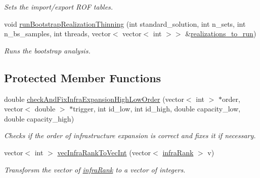 \begin{DoxyCompactItemize}
\begin{DoxyCompactList}\small\item\em Sets the import/export R\+OF tables. \end{DoxyCompactList}\item 
void \mbox{\hyperlink{classProblem_aa5a4c047b3bdc97762cb4e5a91ebd5de_aa5a4c047b3bdc97762cb4e5a91ebd5de}{run\+Bootstrap\+Realization\+Thinning}} (int standard\+\_\+solution, int n\+\_\+sets, int n\+\_\+bs\+\_\+samples, int threads, vector$<$ vector$<$ int $>$$>$ \&\mbox{\hyperlink{classProblem_af9ed9265d0d2b4918bd468d717429de1_af9ed9265d0d2b4918bd468d717429de1}{realizations\+\_\+to\+\_\+run}})
\begin{DoxyCompactList}\small\item\em Runs the bootstrap analysis. \end{DoxyCompactList}\end{DoxyCompactItemize}
\subsection*{Protected Member Functions}
\begin{DoxyCompactItemize}
\item 
double \mbox{\hyperlink{classProblem_ab12ec67ea5734be6c6c2ad46a08dba06_ab12ec67ea5734be6c6c2ad46a08dba06}{check\+And\+Fix\+Infra\+Expansion\+High\+Low\+Order}} (vector$<$ int $>$ $\ast$order, vector$<$ double $>$ $\ast$trigger, int id\+\_\+low, int id\+\_\+high, double capacity\+\_\+low, double capacity\+\_\+high)
\begin{DoxyCompactList}\small\item\em Checks if the order of infrastructure expansion is correct and fixes it if necessary. \end{DoxyCompactList}\item 
vector$<$ int $>$ \mbox{\hyperlink{classProblem_a526ef2b401f498f6eef3342be3151487_a526ef2b401f498f6eef3342be3151487}{vec\+Infra\+Rank\+To\+Vec\+Int}} (vector$<$ \mbox{\hyperlink{structinfraRank}{infra\+Rank}} $>$ v)
\begin{DoxyCompactList}\small\item\em Transforsm the vector of \mbox{\hyperlink{structinfraRank}{infra\+Rank}} to a vector of integers. \end{DoxyCompactList}\end{DoxyCompactItemize}

